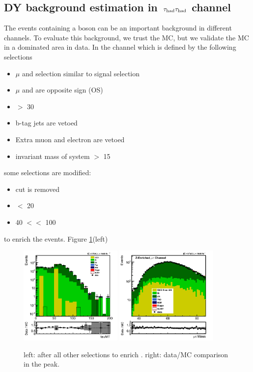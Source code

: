 \subsection{\texorpdfstring{DY background estimation in $\,\tau_{\rm had}\tau_{\rm had}$ channel}{DY background estimation in tau-tau channel}}
The events containing a \Z boson can be an important background in different channels. To evaluate this background, we trust 
the MC, but we validate the MC in a \Z dominated area in data. In the \muTau channel which is defined by the following selections 
\begin{itemize}
\item $\mu$ and \Tau selection similar to signal selection
\item $\mu$ and \Tau are opposite sign (OS)
\item \MPT $>$ 30 
\item b-tag jets are vetoed
\item Extra muon and electron are vetoed 
\item invariant mass of \muTau system $>$ 15 \GeV
\end{itemize}
some selections are modified:
\begin{itemize}
\item \mindphifour cut is removed
\item \mttwo $<$ 20 \GeV
\item 40 $<$\tauMT $<$ 100 \GeV
\end{itemize}
to enrich the \Z events. Figure \ref{fig:ZValidation}(left)
\begin{figure}[h]
\centering
\includegraphics[width=0.45\textwidth,keepaspectratio=true]{ZValidation/tauMT_ZValidation.png}
\includegraphics[width=0.45\textwidth,keepaspectratio=true]{ZValidation/InvMass_ZValidation.png}
\caption{left: \tauMT after all other selections to enrich \Z. right: data/MC comparison in the \Z peak.}
\label{fig:ZValidation}
\end{figure}
